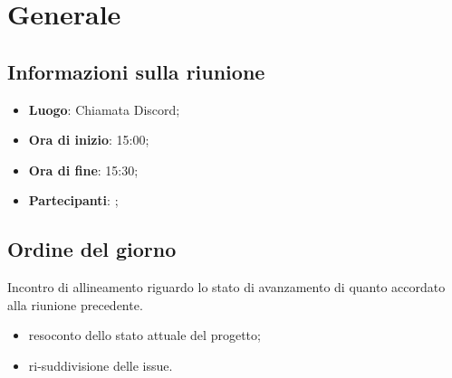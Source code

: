 \section{Generale}

\vspace{10pt}


\subsection{Informazioni sulla riunione}
\begin{itemize}
	\item \textbf{Luogo}: Chiamata Discord;
	\item \textbf{Ora di inizio}: 15:00;
	\item \textbf{Ora di fine}: 15:30;
	\item \textbf{Partecipanti}: \team;
\end{itemize}

\vspace{5pt}

\subsection{Ordine del giorno}
Incontro di allineamento riguardo lo stato di avanzamento di quanto accordato alla riunione precedente.
\begin{itemize}
	\item resoconto dello stato attuale del progetto;
	\item ri-suddivisione delle issue.
\end{itemize}
